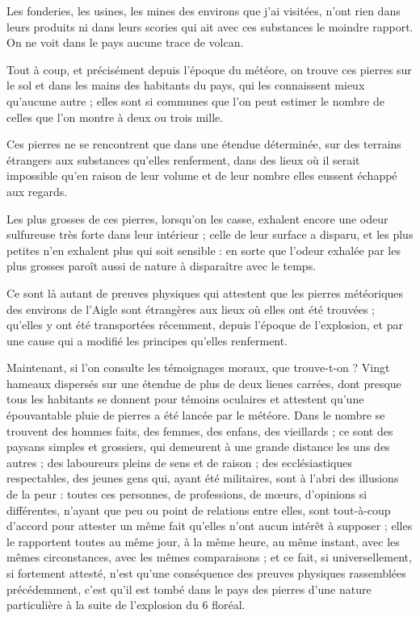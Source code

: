 \documentclass[a4paper, 11pt, oneside, polutonikogreek, french]{article}
\begin{document}
Les fonderies, les usines, les mines des environs que j'ai visitées, n'ont rien dans leurs produits ni dans leurs scories qui ait avec ces substances le moindre rapport. On ne voit dans le pays aucune trace de volcan.

Tout à coup, et précisément depuis l'époque du météore, on trouve ces pierres sur le sol et dans les mains des habitants du pays, qui les connaissent mieux qu'aucune autre ; elles sont si communes que l'on peut estimer le nombre de celles que l'on montre à deux ou trois mille.

Ces pierres ne se rencontrent que dans une étendue déterminée, sur des terrains étrangers aux substances qu'elles renferment, dans des lieux où il serait impossible qu'en raison de leur volume et de leur nombre elles eussent échappé aux regards.

Les plus grosses de ces pierres, lorsqu'on les casse, exhalent encore une odeur sulfureuse très forte dans leur intérieur ; celle de leur surface a disparu, et les plus petites n'en exhalent plus qui soit sensible : en sorte que l'odeur exhalée par les plus grosses paroît aussi de nature à disparaître avec le temps.

Ce sont là autant de preuves physiques qui attestent que les pierres météoriques des environs de l'Aigle sont étrangères aux lieux où elles ont été trouvées ; qu'elles y ont été transportées récemment, depuis l'époque de l'explosion, et par une cause qui a modifié les principes qu'elles renferment.

Maintenant, si l'on consulte les témoignages moraux, que trouve-t-on ? Vingt hameaux dispersés sur une étendue de plus de deux lieues carrées, dont presque tous les habitants se donnent pour témoins oculaires et attestent qu'une épouvantable pluie de pierres a été lancée par le météore. Dans le nombre se trouvent des hommes faits, des femmes, des enfans, des vieillards ; ce sont des paysans simples et grossiers, qui demeurent à une grande distance les uns des autres ; des laboureurs pleins de sens et de raison ; des ecclésiastiques respectables, des jeunes gens qui, ayant été militaires, sont à l'abri des illusions de la peur : toutes ces personnes, de professions, de mœurs, d'opinions si différentes, n'ayant que peu ou point de relations entre elles, sont tout-à-coup d'accord pour attester un même fait qu'elles n'ont aucun intérêt à supposer ; elles le rapportent toutes au même jour, à la même heure, au même instant, avec les mêmes circonstances, avec les mêmes comparaisons ; et ce fait, si universellement, si fortement attesté, n'est qu'une conséquence des preuves physiques rassemblées précédemment, c'est qu'il est tombé dans le pays des pierres d'une nature particulière à la suite de l'explosion du 6 floréal.
\end{document}
